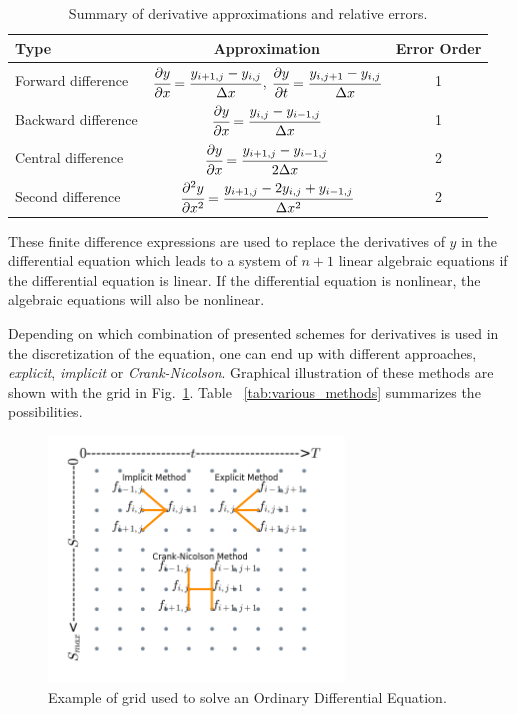 \begin{table}[htb]
    \centering
    \begin{tabular}{|l|c|c|}
    \hline
    Type & Approximation & Error Order \\
    \hline
    Forward difference & $\cfrac{\partial y}{\partial x} = \cfrac{y_{i+1,j}-y_{i,j}}{\Delta x}$, $\cfrac{\partial y}{\partial t} = \cfrac{y_{i,j+1}-y_{i,j}}{\Delta x}$ & 1 \\[1ex]
    \hline
    Backward difference & $\cfrac{\partial y}{\partial x} = \cfrac{y_{i,j}-y_{i-1,j}}{\Delta x}$ & 1 \\[1ex]
    \hline
    Central difference & $\cfrac{\partial y}{\partial x} = \cfrac{y_{i+1,j}-y_{i-1,j}}{2\Delta x}$& 2 \\[1ex]
    \hline
    Second difference & $\cfrac{\partial^2 y}{\partial x^2} = \cfrac{y_{i+1,j}-2y_{i,j} + y_{i-1,j}}{\Delta x^2}$& 2 \\[1ex]
    \hline
    \end{tabular}
\caption{Summary of derivative approximations and relative errors.}
\label{tab:derivative_approximations}
\end{table}

These finite difference expressions are used to replace the derivatives of $y$ in the differential equation which leads to a system of $n+1$ linear algebraic equations if the differential equation is linear. If the differential equation is nonlinear, the algebraic equations will also be nonlinear.

Depending on which combination of presented schemes for derivatives is used in the discretization of the equation, one can end up with different approaches, \emph{explicit}, \emph{implicit} or \emph{Crank-Nicolson}. Graphical illustration of these methods are shown with the grid in Fig.~\ref{fig:grid_finite_difference}. 
Table ~\ref{tab:various_methods} summarizes the possibilities.

\begin{figure}[htb]
	\centering
	\includegraphics[width=0.7\textwidth]{figures/grid_finite_differences}
	\caption{Example of grid used to solve an Ordinary Differential Equation.}
	\label{fig:grid_finite_difference}
\end{figure} 

